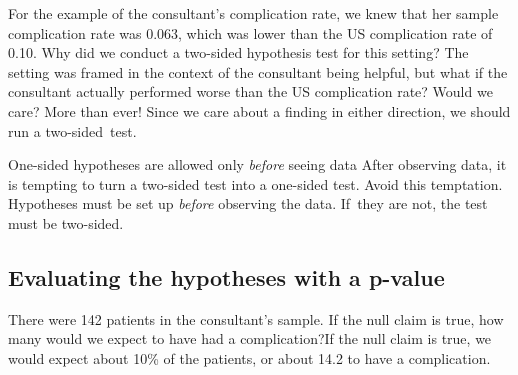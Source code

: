 \begin{examplewrap}
\begin{nexample}{For the example of the consultant's complication rate, we knew that her sample complication rate was 0.063, which was lower than the US complication rate of 0.10. Why did we conduct a two-sided hypothesis test for this setting?}
The setting was framed in the context of the consultant being helpful, but what if the consultant actually performed worse than the US complication rate? Would we care? More than ever! Since we care about a finding in either direction, we should run a two-sided~test.
\end{nexample}
\end{examplewrap}

\begin{onebox}{One-sided hypotheses are allowed only \emph{before} seeing data}
{After observing data, it is tempting to turn a two-sided test into a one-sided test. Avoid this temptation. Hypotheses must be set up \emph{before} observing the data. If~they are not, the test must be two-sided.}
\end{onebox}


\subsection{Evaluating the hypotheses with a p-value}

\begin{examplewrap}
\begin{nexample}
{There were 142 patients in the consultant's sample. If the null claim is true, how many would we expect to have had a complication?}If the null claim is true, we would expect about 10\% of the patients, or about 14.2 to have a complication.
\end{nexample}
\end{examplewrap}

